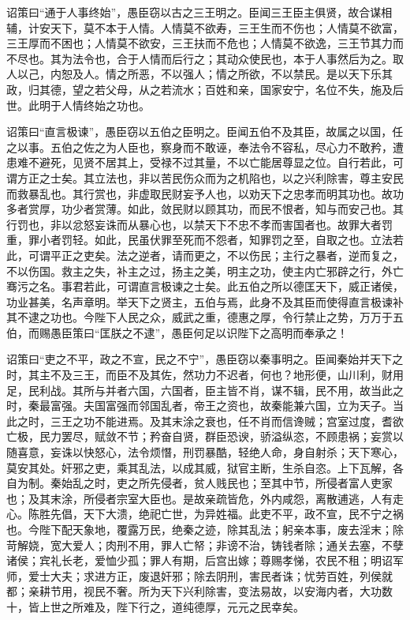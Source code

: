 \documentclass[]{article}
\begin{document}
诏策曰``通于人事终始''，愚臣窃以古之三王明之。臣闻三王臣主俱贤，故合谋相辅，计安天下，莫不本于人情。人情莫不欲寿，三王生而不伤也；人情莫不欲富，三王厚而不困也；人情莫不欲安，三王扶而不危也；人情莫不欲逸，三王节其力而不尽也。其为法令也，合于人情而后行之；其动众使民也，本于人事然后为之。取人以己，内恕及人。情之所恶，不以强人；情之所欲，不以禁民。是以天下乐其政，归其德，望之若父母，从之若流水；百姓和亲，国家安宁，名位不失，施及后世。此明于人情终始之功也。

诏策曰``直言极谏''，愚臣窃以五伯之臣明之。臣闻五伯不及其臣，故属之以国，任之以事。五伯之佐之为人臣也，察身而不敢诬，奉法令不容私，尽心力不敢矜，遭患难不避死，见贤不居其上，受禄不过其量，不以亡能居尊显之位。自行若此，可谓方正之士矣。其立法也，非以苦民伤众而为之机陷也，以之兴利除害，尊主安民而救暴乱也。其行赏也，非虚取民财妄予人也，以劝天下之忠孝而明其功也。故功多者赏厚，功少者赏薄。如此，敛民财以顾其功，而民不恨者，知与而安己也。其行罚也，非以忿怒妄诛而从暴心也，以禁天下不忠不孝而害国者也。故罪大者罚重，罪小者罚轻。如此，民虽伏罪至死而不怨者，知罪罚之至，自取之也。立法若此，可谓平正之吏矣。法之逆者，请而更之，不以伤民；主行之暴者，逆而复之，不以伤国。救主之失，补主之过，扬主之美，明主之功，使主内亡邪辟之行，外亡骞污之名。事君若此，可谓直言极谏之士矣。此五伯之所以德匡天下，威正诸侯，功业甚美，名声章明。举天下之贤主，五伯与焉，此身不及其臣而使得直言极谏补其不逮之功也。今陛下人民之众，威武之重，德惠之厚，令行禁止之势，万万于五伯，而赐愚臣策曰``匡朕之不逮''，愚臣何足以识陛下之高明而奉承之！

诏策曰``吏之不平，政之不宣，民之不宁''，愚臣窃以秦事明之。臣闻秦始并天下之时，其主不及三王，而臣不及其佐，然功力不迟者，何也？地形便，山川利，财用足，民利战。其所与并者六国，六国者，臣主皆不肖，谋不辑，民不用，故当此之时，秦最富强。夫国富强而邻国乱者，帝王之资也，故秦能兼六国，立为天子。当此之时，三王之功不能进焉。及其末涂之衰也，任不肖而信谗贼；宫室过度，耆欲亡极，民力罢尽，赋敛不节；矜奋自贤，群臣恐谀，骄溢纵恣，不顾患祸；妄赏以随喜意，妄诛以快怒心，法令烦憯，刑罚暴酷，轻绝人命，身自射杀；天下寒心，莫安其处。奸邪之吏，乘其乱法，以成其威，狱官主断，生杀自恣。上下瓦解，各自为制。秦始乱之时，吏之所先侵者，贫人贱民也；至其中节，所侵者富人吏家也；及其末涂，所侵者宗室大臣也。是故亲疏皆危，外内咸怨，离散逋逃，人有走心。陈胜先倡，天下大溃，绝祀亡世，为异姓福。此吏不平，政不宣，民不宁之祸也。今陛下配天象地，覆露万民，绝秦之迹，除其乱法；躬亲本事，废去淫末；除苛解娆，宽大爱人；肉刑不用，罪人亡帑；非谤不治，铸钱者除；通关去塞，不孽诸侯；宾礼长老，爱恤少孤；罪人有期，后宫出嫁；尊赐孝悌，农民不租；明诏军师，爱士大夫；求进方正，废退奸邪；除去阴刑，害民者诛；忧劳百姓，列侯就都；亲耕节用，视民不奢。所为天下兴利除害，变法易故，以安海内者，大功数十，皆上世之所难及，陛下行之，道纯德厚，元元之民幸矣。
\end{document}
